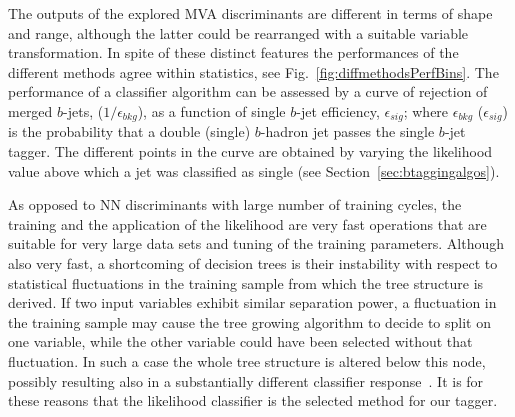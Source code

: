 The outputs of the explored MVA discriminants are different in terms of shape and range, although the latter could be rearranged with a suitable variable transformation.  In spite of these distinct features the performances of the different methods agree within statistics, see Fig.~\ref{fig:diffmethodsPerfBins}.  
The performance of a classifier algorithm can be assessed by a curve of rejection of merged $b$-jets, ($1/\epsilon_{bkg}$), as a function of single $b$-jet efficiency, $\epsilon_{sig}$; where $\epsilon_{bkg}$ ($\epsilon_{sig}$) is the probability that a double (single) $b$-hadron jet passes the single $b$-jet tagger. The different points in the curve are obtained by varying the likelihood value above which a jet was classified as single (see Section~\ref{sec:btaggingalgos}).

As opposed to NN discriminants with large number of training cycles, the training and the application of the likelihood are very fast operations that are suitable for very large data sets and tuning of the training parameters. Although also very fast, a shortcoming of decision trees is their instability with respect to statistical fluctuations in the training sample from which the tree structure is derived. If two input variables exhibit similar separation power, a fluctuation in the training sample may cause the tree growing algorithm to decide to split on one variable, while the other variable could have been selected without that fluctuation. In such a case the whole tree structure is altered below this node, possibly resulting also in a substantially different classifier response~\cite{Hocker:2007ht}. It is for these reasons that the likelihood classifier is the selected method for our tagger.

